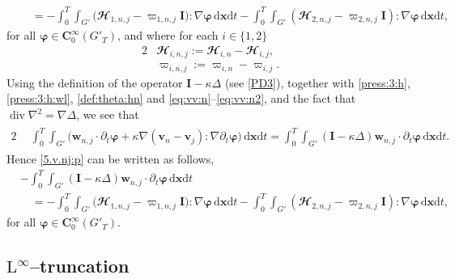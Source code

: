 \documentclass[12pt,reqno]{amsart}
\numberwithin{equation}{section}
\theoremstyle{definition}
\def\dxt{\,\mathrm{d}\boldsymbol{x}\mathrm{d}t}
\def\div{\operatorname{div}}
\def\vv{\boldsymbol{v}}
\def\w{\boldsymbol{w}}
\def\bfC{\mathbf{C}}
\def\bfI{\mathbf{I}}
\def\bfi{\boldsymbol{\varphi}}
\def\bcH{\mathbfcal{H}}
\begin{document}
{{\begin{equation}
\begin{split}
		&\quad =-
		\!\int_{0}^{T}\!\!\!\!\int_{G'}\big(\bcH_{1,n,j}-\varpi_{1,n,j}\bfI\big):\nabla\bfi  \dxt
		-\!\int_{0}^{T}\!\!\!\!\int_{G'}(\bcH_{2,n,j}-\varpi_{2,n,j}\bfI):\nabla\bfi \dxt,
\end{split}
\end{equation}
for all $\bfi \in \bfC_0^\infty(G'_T)$, {and where for each $i\in\{1,2\}$
\begin{alignat}{2}
& \bcH_{i,n,j}:= \bcH_{i,n}-\bcH_{i,j}, \label{H:inj} \\
& \varpi_{i,n,j}:=\varpi_{i,n}-\varpi_{i,j} \label{varpi:inj}.
\end{alignat}
}
{Using the definition of the operator $\bfI-\kappa\Delta$ (see \eqref{PD3}), together with \eqref{press:3:h}, \eqref{press:3:h:wl}, \eqref{def:theta:hn} and \eqref{eq:vv:n}--\eqref{eq:vv:n2}, and the fact that $\div\nabla^2=\nabla\Delta$, we see that
{	\begin{alignat*}{2}
		\begin{split}
			& \!\int_{0}^{T}\!\!\!\!\int_{G'}\Big(\w_{n,j}\cdot{\partial_t\bfi} + \kappa\nabla(\vv_n-\vv_j):\nabla{\partial_t\bfi}\Big)\dxt
			 =
			\!\int_{0}^{T}\!\!\!\!\int_{G'}(\bfI-\kappa\Delta)\w_{n,j}\cdot{\partial_t\bfi}  \dxt.
		\end{split}
	\end{alignat*}}
Hence \eqref{5.v.nj:p} can be written as follows, }
{\begin{equation}\label{5.v.nj}
\begin{split}
		&
		-\!\int_{0}^{T}\!\!\!\!\int_{G'}(\bfI-\kappa \Delta)\w_{n,j}\cdot{\partial_t\bfi}  \dxt \\
		&\quad =
	-	\!\int_{0}^{T}\!\!\!\!\int_{G'}\big(\bcH_{1,n,j}-\varpi_{1,n,j}\bfI\big):\nabla\bfi  \dxt
		-\!\int_{0}^{T}\!\!\!\!\int_{G'}(\bcH_{2,n,j}-\varpi_{2,n,j}\bfI):\nabla\bfi \dxt,
\end{split}
\end{equation}
for all $\bfi \in \bfC_0^\infty(G'_T)$.}



\subsection{$\mathrm{L}^\infty$--truncation}\label{Linf:T}

}}
\end{document}
